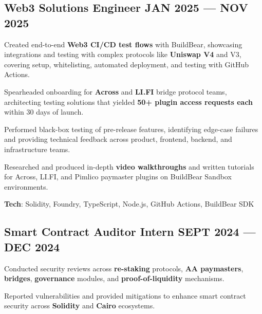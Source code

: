 \documentclass[letter,10pt]{article}
\begin{document}
\subsection{{Web3 Solutions Engineer \hfill JAN 2025 --- NOV 2025}}
\begin{zitemize}
  \item Created end-to-end \textbf{Web3 CI/CD test flows} with BuildBear, showcasing integrations and testing with complex protocols like \textbf{Uniswap V4} and V3, covering setup, whitelisting, automated deployment, and testing with GitHub Actions.
  \item Spearheaded onboarding for \textbf{Across} and \textbf{LI.FI} bridge protocol teams, architecting testing solutions that yielded \textbf{50+ plugin access requests each} within 30 days of launch.
  \item Performed black-box testing of pre-release features, identifying edge-case failures and providing technical feedback across product, frontend, backend, and infrastructure teams.
  \item Researched and produced in-depth \textbf{video walkthroughs} and written tutorials for Across, LI.FI, and Pimlico paymaster plugins on BuildBear Sandbox environments.
  \item \textbf{Tech}: Solidity, Foundry, TypeScript, Node.js, GitHub Actions, BuildBear SDK
\end{zitemize}


\subsection{{Smart Contract Auditor Intern \hfill SEPT 2024 --- DEC 2024}}
\begin{zitemize}
  \item Conducted security reviews across \textbf{re-staking} protocols, \textbf{AA paymasters}, \textbf{bridges}, \textbf{governance} modules, and \textbf{proof-of-liquidity} mechanisms.
  \item Reported vulnerabilities and provided mitigations to enhance smart contract security across \textbf{Solidity} and \textbf{Cairo} ecosystems.
\end{zitemize}
\end{document}
